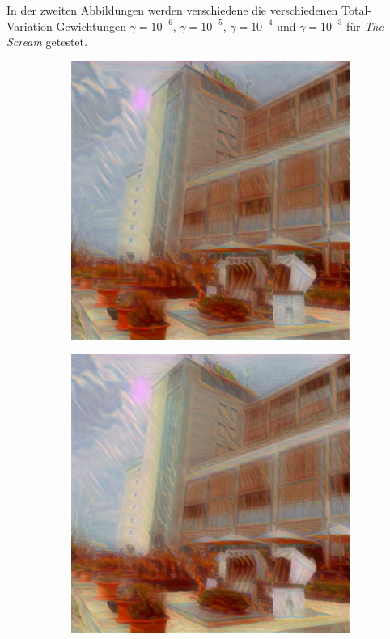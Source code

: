 In der zweiten Abbildungen werden verschiedene die verschiedenen Total-Variation-Gewichtungen $ \gamma = 10^{-6} $, $ \gamma = 10^{-5} $, $ \gamma = 10^{-4} $ und $ \gamma = 10^{-3} $ für \textit{The Scream} getestet.

\begin{figure}[H]
    \centering
    \begin{subfigure}[h]{0.24\textwidth}
        \centering
        \includegraphics[width=\textwidth]{resources/content/experiments/b__the_scream__768x768__style-weight_1e+07__tv-weight_1e-06.jpg}
    \end{subfigure}
    \begin{subfigure}[h]{0.24\textwidth}
        \centering
        \includegraphics[width=\textwidth]{resources/content/experiments/b__the_scream__768x768__style-weight_1e+07__tv-weight_1e-05.jpg}

\end{subfigure}
\end{figure}

